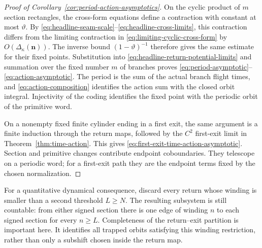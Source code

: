 \documentclass[11pt]{amsart}
\numberwithin{equation}{section}
\theoremstyle{definition}
\theoremstyle{remark}
\begin{document}
\begin{proof}[Proof of Corollary~\ref{cor:period-action-asymptotics}]
On the cyclic product of $m$ section rectangles, the cross-form equations
define a contraction with constant at most $\vartheta$.  By
\eqref{eq:headline-seam-scale}--\eqref{eq:headline-cross-limits}, this
contraction differs from the
limiting contraction in \eqref{eq:limiting-cyclic-cross-form} by
$O(\Delta_\kappa(\mathbf n))$.  The inverse bound
$(1-\vartheta)^{-1}$ therefore gives the same estimate for their fixed
points.  Substitution into \eqref{eq:headline-return-potential-limits} and
summation over the fixed number $m$ of branches proves
\eqref{eq:period-asymptotic}--\eqref{eq:action-asymptotic}.  The period is
the sum of the actual branch flight times, and
\eqref{eq:action-composition} identifies the action sum with the closed
orbit integral.  Injectivity of the coding identifies the fixed point with
the periodic orbit of the primitive word.

On a nonempty fixed finite cylinder ending in a first exit, the same argument
is a finite induction through the return maps, followed by the $C^2$ first-exit
limit in Theorem~\ref{thm:time-action}.  This gives
\eqref{eq:first-exit-time-action-asymptotic}.  Section and primitive changes
contribute endpoint coboundaries.  They telescope on a periodic word; for a
first-exit path they are the endpoint terms fixed by the chosen normalization.
\end{proof}

For a quantitative dynamical consequence, discard every return whose
winding is smaller than a second threshold $L\ge N$.  The resulting
subsystem is still countable: from either signed section there is one edge
of winding $n$ to each signed section for every $n\ge L$.  Completeness of
the return--exit partition is important here.  It identifies all trapped
orbits satisfying this winding restriction, rather than only a subshift
chosen inside the return map.
\end{document}
